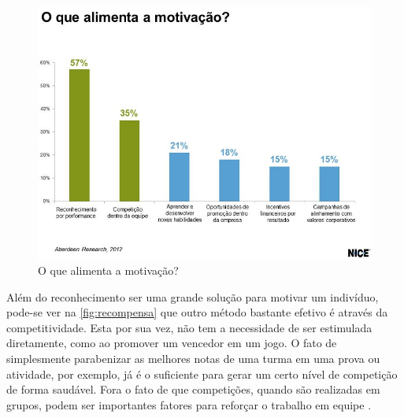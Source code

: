 \begin{figure}[htb]
    \centering
	\includegraphics[width=16cm]{imagens/recompensa.jpg}
	\caption{\label{fig:recompensa}O que alimenta a motivação?}
\end{figure}

Além do reconhecimento ser uma grande solução para motivar um indivíduo, pode-se ver na \autoref{fig:recompensa} que outro método bastante efetivo é através da competitividade. Esta por sua vez, não tem a necessidade de ser estimulada diretamente, como ao promover um vencedor em um jogo. O fato de simplesmente parabenizar as melhores notas de uma turma em uma prova ou atividade, por exemplo, já é o suficiente para gerar um certo nível de competição de forma saudável. Fora o fato de que competições, quando são realizadas em grupos, podem ser importantes fatores para reforçar o trabalho em equipe \cite{gamificação-na-ead:2014}.

\FloatBarrier



